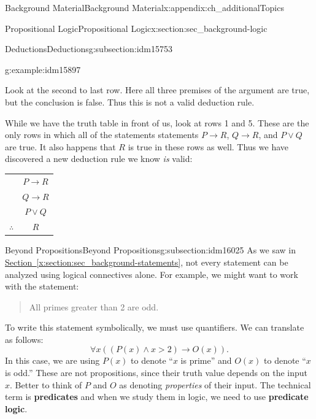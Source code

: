 \documentclass[oneside,10pt,]{book}
\newcommand{\terminology}[1]{\textbf{#1}}
\numberwithin{equation}{chapter}
\newcommand{\hrulethin}  {\noalign{\hrule height 0.04em}}
\def\imp{\rightarrow}
\newcommand{\gt}{>}
\begin{document}
\begin{appendixptx}{Background Material}{}{Background Material}{}{}{x:appendix:ch_additionalTopics}
\begin{sectionptx}{Propositional Logic}{}{Propositional Logic}{}{}{x:section:sec_background-logic}
\begin{subsectionptx}{Deductions}{}{Deductions}{}{}{g:subsection:idm15753}
\begin{example}{}{g:example:idm15897}
\begin{sidebyside}{1}{0}{0}{0}
\begin{sbspanel}{1}
\end{sbspanel}%
\end{sidebyside}%
\par
Look at the second to last row.  Here all three premises of the argument are true, but the conclusion is false.  Thus this is not a valid deduction rule.%
\par
While we have the truth table in front of us, look at rows 1 and 5.  These are the only rows in which all of the statements statements \(P \imp R\), \(Q \imp R\), and \(P\vee Q\) are true.  It also happens that \(R\) is true in these rows as well.  Thus we have discovered a new deduction rule we know \emph{is} valid:%
\begin{sidebyside}{1}{0}{0}{0}%
\begin{sbspanel}{1}%
{\centering%
\begin{tabular}{cc}
&\(P \imp R\)\tabularnewline[0pt]
&\(Q \imp R\)\tabularnewline[0pt]
&\(P \vee Q\)\tabularnewline\hrulethin
\(\therefore\)&\(R\)
\end{tabular}
\par}
\end{sbspanel}%
\end{sidebyside}%
\end{example}
\end{subsectionptx}
%
%
\typeout{************************************************}
\typeout{************************************************}
%
\begin{subsectionptx}{Beyond Propositions}{}{Beyond Propositions}{}{}{g:subsection:idm16025}
As we saw in \hyperref[x:section:sec_background-statements]{Section~\ref{x:section:sec_background-statements}}, not every statement can be analyzed using logical connectives alone.  For example, we might want to work with the statement:%
\begin{quote}%
All primes greater than 2 are odd.%
\end{quote}
To write this statement symbolically, we must use quantifiers.  We can translate as follows:%
\begin{equation*}
\forall x ((P(x) \wedge x \gt 2) \imp O(x)).
\end{equation*}
In this case, we are using \(P(x)\) to denote ``\(x\) is prime'' and \(O(x)\) to denote ``\(x\) is odd.''  These are not propositions, since their truth value depends on the input \(x\).  Better to think of \(P\) and \(O\) as denoting \emph{properties} of their input.  The technical term is \terminology{predicates} and when we study them in logic, we need to use \terminology{predicate logic}.%

\end{subsectionptx}
\end{sectionptx}
\end{appendixptx}
\end{document}
